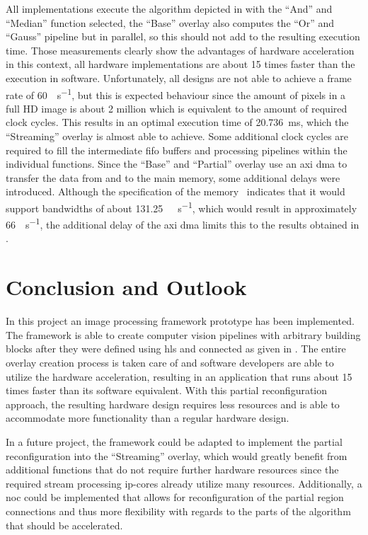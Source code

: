 \documentclass{scrartcl}
\begin{document}
All implementations execute the algorithm depicted in  with the
“And” and “Median” function selected, the “Base” overlay also computes the “Or”
and “Gauss” pipeline but in parallel, so this should not add to the resulting
execution time. Those measurements clearly show the advantages of hardware
acceleration in this context, all hardware implementations are about 15 times
faster than the execution in software. Unfortunately, all designs are not able
to achieve a frame rate of \SI{60}{\frm\per\second}, but this is expected
behaviour since the amount of pixels in a full HD image is about \num{2} million
which is equivalent to the amount of required clock cycles. This results in an
optimal execution time of \SI{20.736}{\milli\second}, which the “Streaming”
overlay is almost able to achieve. Some additional clock cycles are required to
fill the intermediate \gls{fifo} buffers and processing pipelines within the
individual functions. Since the “Base” and “Partial” overlay use an \gls{axi}
\gls{dma} to transfer the data from and to the main memory, some additional
delays were introduced. Although the specification of the
memory~\cite{pynqz1spec} indicates that it would support bandwidths of about
\SI{131.25}{\mega\byte\per\second}, which would result in approximately
\SI{66}{\frm\per\second}, the additional delay of the \gls{axi} \gls{dma} limits
this to the results obtained in .


\section{Conclusion and Outlook}

In this project an image processing framework prototype has been implemented.
The framework is able to create computer vision pipelines with arbitrary
building blocks after they were defined using \gls{hls} and connected as given
in . The entire overlay creation process is taken care of and
software developers are able to utilize the hardware acceleration, resulting in
an application that runs about 15 times faster than its software equivalent.
With this partial reconfiguration approach, the resulting hardware design
requires less resources and is able to accommodate more functionality than a
regular hardware design.

In a future project, the framework could be adapted to implement the partial
reconfiguration into the “Streaming” overlay, which would greatly benefit from
additional functions that do not require further hardware resources since the
required stream processing \gls{ip}-cores already utilize many resources.
Additionally, a \gls{noc} could be implemented that allows for reconfiguration
of the partial region connections and thus more flexibility with regards to the
parts of the algorithm that should be accelerated.


\printbibliography%
\end{document}
